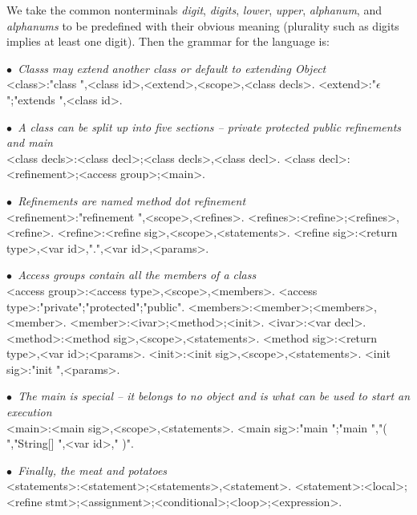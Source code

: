 We take the common nonterminals \emph{digit}, \emph{digits}, \emph{lower}, \emph{upper}, \emph{alphanum}, and \emph{alphanums} to be predefined with their obvious meaning (plurality such as digits implies at least one digit). Then the grammar for the language is:

\newcommand{\comment}[1]{{\escapegrammar$\bullet$\it\ #1}\\}

\begin{grammar}

\comment{Classs may extend another class or default to extending Object}
<class>:"class ",<class id>,<extend>,<scope>,<class decls>.
<extend>:"$\epsilon$";"extends ",<class id>.

\comment{A class can be split up into five sections -- private protected public refinements and main}
<class decls>:<class decl>;<class decls>,<class decl>.
<class decl>:<refinement>;<access group>;<main>.

\comment{Refinements are named method dot refinement}
<refinement>:"refinement ",<scope>,<refines>.
<refines>:<refine>;<refines>,<refine>.
<refine>:<refine sig>,<scope>,<statements>.
<refine sig>:<return type>,<var id>,".",<var id>,<params>.

\comment{Access groups contain all the members of a class}
<access group>:<access type>,<scope>,<members>.
<access type>:"private";"protected";"public".
<members>:<member>;<members>,<member>.
<member>:<ivar>;<method>;<init>.
<ivar>:<var decl>.
<method>:<method sig>,<scope>,<statements>.
<method sig>:<return type>,<var id>;<params>.
<init>:<init sig>,<scope>,<statements>.
<init sig>:"init ",<params>.

\comment{The main is special -- it belongs to no object and is what can be used to start an execution}
<main>:<main sig>,<scope>,<statements>.
<main sig>:"main ";"main ","( ","String[] ",<var id>," )".

\comment{Finally, the meat and potatoes}
<statements>:<statement>;<statements>,<statement>.
<statement>:<local>;<refine stmt>;<assignment>;<conditional>;<loop>;<expression>.


\end{grammar}

